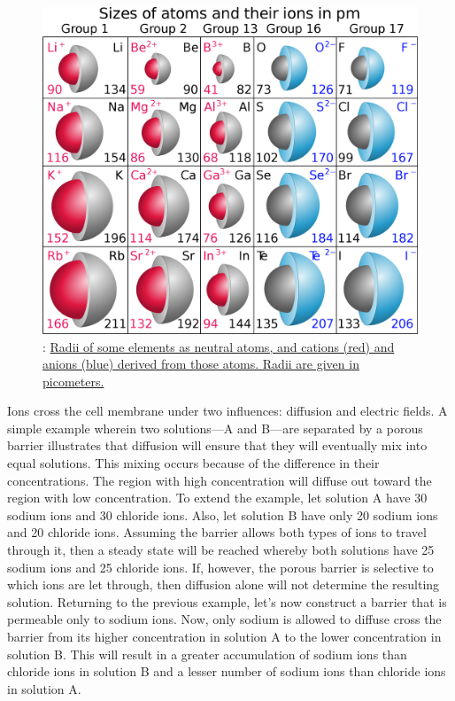 \begin{figure}

{\centering \includegraphics[width=0.7\linewidth]{./figures/potential/Atomic_and_ionic_radii} 

}

\caption{: \href{https://commons.wikimedia.org/wiki/File:Atomic_\%26_ionic_radii.svg}{Radii of some elements as neutral atoms, and cations (red) and anions (blue) derived from those atoms. Radii are given in picometers.}}\label{fig:ionsize}
\end{figure}

Ions cross the cell membrane under two influences: diffusion and electric fields. A simple example wherein two solutions---A and B---are separated by a porous barrier illustrates that diffusion will ensure that they will eventually mix into equal solutions. This mixing occurs because of the difference in their concentrations. The region with high concentration will diffuse out toward the region with low concentration. To extend the example, let solution A have 30 sodium ions and 30 chloride ions. Also, let solution B have only 20 sodium ions and 20 chloride ions. Assuming the barrier allows both types of ions to travel through it, then a steady state will be reached whereby both solutions have 25 sodium ions and 25 chloride ions. If, however, the porous barrier is selective to which ions are let through, then diffusion alone will not determine the resulting solution. Returning to the previous example, let's now construct a barrier that is permeable only to sodium ions. Now, only sodium is allowed to diffuse cross the barrier from its higher concentration in solution A to the lower concentration in solution B. This will result in a greater accumulation of sodium ions than chloride ions in solution B and a lesser number of sodium ions than chloride ions in solution A.


